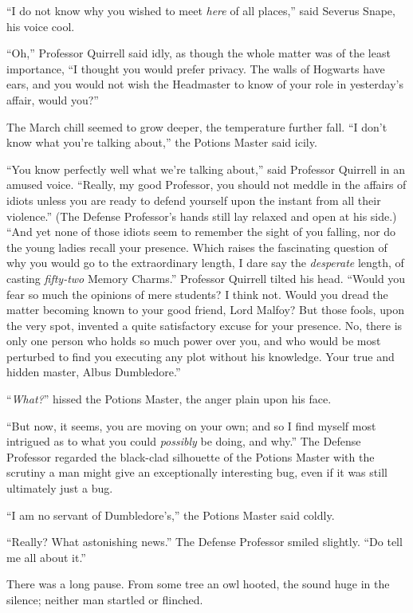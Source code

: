 ``I do not know why you wished to meet \emph{here} of all places,'' said Severus Snape, his voice cool.

``Oh,'' Professor Quirrell said idly, as though the whole matter was of the least importance, ``I thought you would prefer privacy. The walls of Hogwarts have ears, and you would not wish the Headmaster to know of your role in yesterday's affair, would you?''

The March chill seemed to grow deeper, the temperature further fall. ``I don't know what you're talking about,'' the Potions Master said icily.

``You know perfectly well what we're talking about,'' said Professor Quirrell in an amused voice. ``Really, my good Professor, you should not meddle in the affairs of idiots unless you are ready to defend yourself upon the instant from all their violence.'' (The Defense Professor's hands still lay relaxed and open at his side.) ``And yet none of those idiots seem to remember the sight of you falling, nor do the young ladies recall your presence. Which raises the fascinating question of why you would go to the extraordinary length, I dare say the \emph{desperate} length, of casting \emph{fifty-two} Memory Charms.'' Professor Quirrell tilted his head. ``Would you fear so much the opinions of mere students? I think not. Would you dread the matter becoming known to your good friend, Lord Malfoy? But those fools, upon the very spot, invented a quite satisfactory excuse for your presence. No, there is only one person who holds so much power over you, and who would be most perturbed to find you executing any plot without his knowledge. Your true and hidden master, Albus Dumbledore.''

``\emph{What?}'' hissed the Potions Master, the anger plain upon his face.

``But now, it seems, you are moving on your own; and so I find myself most intrigued as to what you could \emph{possibly} be doing, and why.'' The Defense Professor regarded the black-clad silhouette of the Potions Master with the scrutiny a man might give an exceptionally interesting bug, even if it was still ultimately just a bug.

``I am no servant of Dumbledore's,'' the Potions Master said coldly.

``Really? What astonishing news.'' The Defense Professor smiled slightly. ``Do tell me all about it.''

There was a long pause. From some tree an owl hooted, the sound huge in the silence; neither man startled or flinched.

